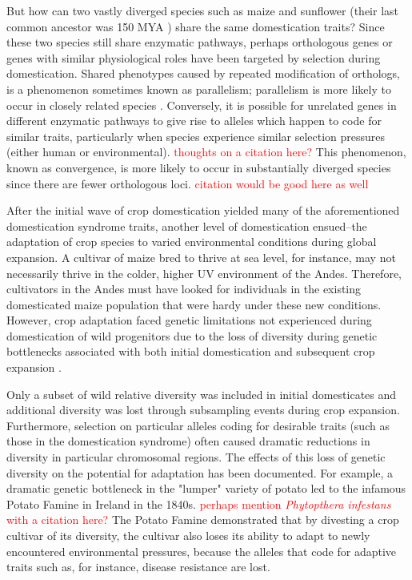 \documentclass[12pt]{article}
\newcommand{\mbh}[1]{\textcolor{red}{\normalsize  #1}}
\begin{document}
But how can two vastly diverged species such as maize and sunflower  (their last common ancestor was 150 MYA \citep{Chang2004}) share the same domestication traits? 
Since these two species still share enzymatic pathways, perhaps orthologous genes or genes with similar physiological roles have been targeted by selection during domestication.
Shared phenotypes caused by repeated modification of orthologs, is a phenomenon sometimes known as parallelism; parallelism is more likely to occur in closely related species \citep{Pickersgill2018}.
Conversely, it is possible for unrelated genes in different enzymatic pathways to give rise to alleles which happen to code for similar traits, particularly when species experience similar selection pressures (either human or environmental). \mbh{thoughts on a citation here?}
This phenomenon, known as convergence, is more likely to occur in substantially diverged species since there are fewer orthologous loci. \mbh{citation would be good here as well}

After the initial wave of crop domestication yielded many of the aforementioned domestication syndrome traits, another level of domestication ensued--the adaptation of crop species to varied environmental conditions during global expansion.
A cultivar of maize bred to thrive at sea level, for instance, may not necessarily thrive in the colder, higher UV environment of the Andes.
Therefore, cultivators in the Andes must have looked for individuals in the existing domesticated maize population that were hardy under these new conditions.
However, crop adaptation faced genetic limitations not experienced during domestication of wild progenitors due to the loss of diversity during genetic bottlenecks associated with both initial domestication and subsequent crop expansion \cite{Wang2017}. 

Only a subset of wild relative diversity was included in initial domesticates and additional diversity was lost through subsampling events during crop expansion.
Furthermore, selection on particular alleles coding for desirable traits (such as those in the domestication syndrome) often caused dramatic reductions in diversity in particular chromosomal regions.
The effects of this loss of genetic diversity on the potential for adaptation has been documented.
For example, a dramatic genetic bottleneck in the "lumper" variety of potato led to the infamous Potato Famine in Ireland in the 1840s. \mbh{perhaps mention \emph{Phytopthera infestans} with a citation here?}
The Potato Famine demonstrated that by divesting a crop cultivar of its diversity, the cultivar also loses its ability to adapt to newly encountered environmental pressures, because the alleles that code for adaptive traits such as, for instance, disease resistance are lost.
\end{document}
